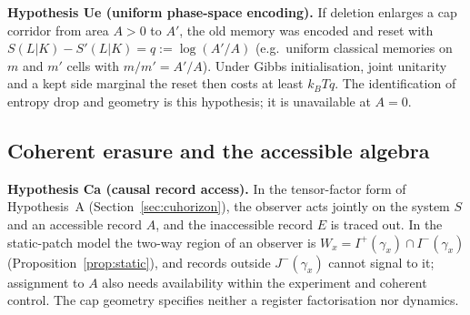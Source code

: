 \documentclass[aps,pra,onecolumn,superscriptaddress,nofootinbib,10pt]{revtex4-2}
\theoremstyle{definition}
\theoremstyle{remark}
\begin{document}
\smallskip\noindent\textbf{Hypothesis Ue (uniform phase-space encoding).}\label{hyp:Ue}  If deletion enlarges a cap corridor from area $A>0$ to
$A'$, the old memory was encoded and reset with $S(L|K)-S'(L|K)=q:=\log(A'/A)$ (e.g.\ uniform classical memories on $m$ and $m'$
cells with $m/m'=A'/A$).  Under Gibbs initialisation, joint unitarity and a kept side marginal the reset then costs
at least $k_BTq$.  The identification of entropy drop and geometry is this hypothesis; it is unavailable at $A=0$.

\subsection{Coherent erasure and the accessible algebra}\label{sec:fmerasure}

\smallskip\noindent\textbf{Hypothesis Ca (causal record access).}\label{hyp:Ca}  In the tensor-factor form of Hypothesis~A
(Section~\ref{sec:cuhorizon}), the observer acts jointly on the system $S$ and an accessible record $A$, and the
inaccessible record $E$ is traced out.  In the static-patch model the two-way region of an observer is
$W_x=I^+(\gamma_x)\cap I^-(\gamma_x)$ (Proposition~\ref{prop:static}), and records outside $J^-(\gamma_x)$ cannot signal to it; assignment to $A$ also
needs availability within the experiment and coherent control.  The cap geometry specifies neither a
register factorisation nor dynamics.
\end{document}
